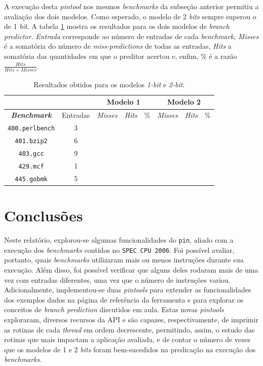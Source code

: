 \documentclass[12pt]{article}
\begin{document}
A execução desta \textit{pintool} nos mesmos \textit{benchmarks} da subseção
anterior permitiu a avaliação dos dois modelos. Como esperado,
o modelo de 2 \textit{bits} sempre superou o de 1 \textit{bit}. A tabela
\ref{tab:modelos} mostra os resultados para os dois modelos de \textit{branch
predictor}. \textit{Entrada} corresponde ao número de entradas de cada
\textit{benchmark}, \textit{Misses} é a somatória do número de
\textit{miss-predictions} de todas as entradas, \textit{Hits} a somatória das
quantidades em que o preditor acertou e, enfim, \% é a razão 
\(\frac{Hits}{Hits+Misses}\).

 \begin{table}[h]
    \centering
	\caption{\label{tab:modelos} Resultados obtidos para os modelos \textit{1-bit}
	e \textit{2-bit}.}
	\begin{tabular}{ c | c | c | c | c | c | c | c |}
		\hline
		\multicolumn{2}{c|}{} & \multicolumn{3}{c|}{\textbf{Modelo 1}} &
		\multicolumn{3}{c|}{\textbf{Modelo 2}}	\\ 	\hline 
		\textit{\textbf{Benchmark}} & Entradas  & \textit{Misses} & \textit{Hits} & \%
		& \textit{Misses} & \textit{Hits} & \% \\
		\hline \hline \texttt{400.perlbench} & 3 & & & & & \\ \hline
		\texttt{401.bzip2} & 6 & &  & & & \\ \hline 
		\texttt{403.gcc} & 9 & & & & & \\
		\hline \texttt{429.mcf} & 1 & & & & & \\ \hline 
		\texttt{445.gobmk} & 5 & & & & & \\ \hline 		
	\end{tabular}	    
\end{table} 


\section{Conclusões}

Neste relatório, explorou-se algumas funcionalidades do \texttt{pin}, aliado
com a execução dos \textit{benchmarks} contidos no \texttt{SPEC CPU 2006}. Foi
possível avaliar, portanto, quais \textit{benchmarks} utilizaram mais
ou menos instruções durante sua execução. Além disso, foi possível verificar
que alguns deles rodaram mais de uma vez com entradas diferentes, uma vez que o número de
instruções variou. Adicionalmente, implementou-se duas \textit{pintools} para
extender as funcionalidades dos exemplos dados na página de referência da ferramenta e para
explorar os conceitos de \textit{branch prediction} discutidos em aula.
Estas novas \textit{pintools} exploraram, diversos recursos da API e são
capazes, respectivamente, de imprimir as rotinas de cada \textit{thread} em ordem
decrescente, permitindo, assim, o estudo das rotinas que mais impactam a aplicação
avaliada, e de contar o número de vezes que os modelos de 1 e 2 \textit{bits}
foram bem-sucedidos na predicação na execução dos \textit{benchmarks}.




\end{document}
